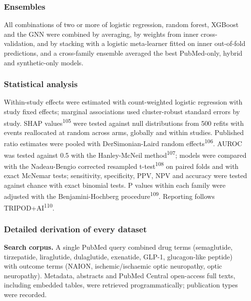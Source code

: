 \documentclass[
  11pt,
]{article}
\begin{document}
\subsubsection{Ensembles}\label{ensembles}

All combinations of two or more of logistic regression, random forest,
XGBoost and the GNN were combined by averaging, by weights from inner
cross-validation, and by stacking with a logistic meta-learner fitted on
inner out-of-fold predictions, and a cross-family ensemble averaged the
best PubMed-only, hybrid and synthetic-only models.

\subsubsection{Statistical analysis}\label{statistical-analysis}

Within-study effects were estimated with count-weighted logistic
regression with study fixed effects; marginal associations used
cluster-robust standard errors by study. SHAP
values\textsuperscript{105} were tested against null distributions from
500 refits with events reallocated at random across arms, globally and
within studies. Published ratio estimates were pooled with
DerSimonian-Laird random effects\textsuperscript{106}. AUROC was tested
against 0.5 with the Hanley-McNeil method\textsuperscript{107}; models
were compared with the Nadeau-Bengio corrected resampled
t-test\textsuperscript{108} on paired folds and with exact McNemar
tests; sensitivity, specificity, PPV, NPV and accuracy were tested
against chance with exact binomial tests. P values within each family
were adjusted with the Benjamini-Hochberg
procedure\textsuperscript{109}. Reporting follows
TRIPOD+AI\textsuperscript{110}.

\subsubsection{Detailed derivation of every
dataset}\label{detailed-derivation-of-every-dataset}

\textbf{Search corpus.} A single PubMed query combined drug terms
(semaglutide, tirzepatide, liraglutide, dulaglutide, exenatide, GLP-1,
glucagon-like peptide) with outcome terms (NAION, ischemic/ischaemic
optic neuropathy, optic neuropathy). Metadata, abstracts and PubMed
Central open-access full texts, including embedded tables, were
retrieved programmatically; publication types were recorded.
\end{document}
